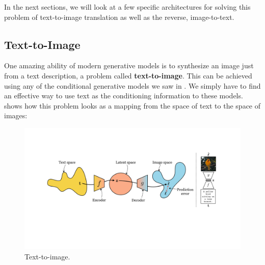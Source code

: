 In the next sections, we will look at a few specific architectures for solving this problem of text-to-image translation as well as the reverse, image-to-text.






\subsection{Text-to-Image}

One amazing ability of modern generative models is to synthesize an image just from a text description, a problem called \textbf{text-to-image}. This can be achieved using any of the conditional generative models we saw in \chap{\ref{chapter:conditional_generative_models}}. We simply have to find an effective way to use text as the conditioning information to these models. \Fig{\ref{fig:vision_and_language:text2im_schematic_mapping}} shows how this problem looks as a mapping from the space of text to the space of images:
\begin{figure}[h]
    \centerline{
        \includegraphics[width=1.0\linewidth]{figures/vision_and_language/text2im_schematic_mapping.pdf}}
        \caption{Text-to-image.}
        \label{fig:vision_and_language:text2im_schematic_mapping}
\end{figure}

